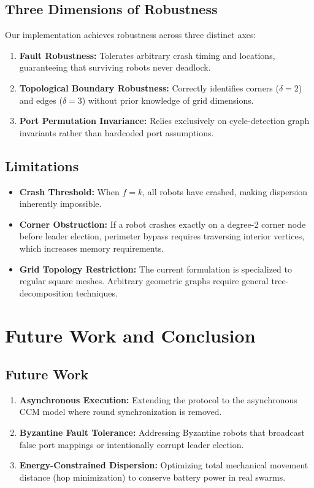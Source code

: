 \documentclass[11pt,a4paper]{report}
\begin{document}
\section{Three Dimensions of Robustness}
Our implementation achieves robustness across three distinct axes:
\begin{enumerate}
    \item \textbf{Fault Robustness:} Tolerates arbitrary crash timing and locations, guaranteeing that surviving robots never deadlock.
    \item \textbf{Topological Boundary Robustness:} Correctly identifies corners ($\delta=2$) and edges ($\delta=3$) without prior knowledge of grid dimensions.
    \item \textbf{Port Permutation Invariance:} Relies exclusively on cycle-detection graph invariants rather than hardcoded port assumptions.
\end{enumerate}

\section{Limitations}
\begin{itemize}
    \item \textbf{Crash Threshold:} When $f = k$, all robots have crashed, making dispersion inherently impossible.
    \item \textbf{Corner Obstruction:} If a robot crashes exactly on a degree-2 corner node before leader election, perimeter bypass requires traversing interior vertices, which increases memory requirements.
    \item \textbf{Grid Topology Restriction:} The current formulation is specialized to regular square meshes. Arbitrary geometric graphs require general tree-decomposition techniques.
\end{itemize}

\chapter{Future Work and Conclusion}

\section{Future Work}
\begin{enumerate}
    \item \textbf{Asynchronous Execution:} Extending the protocol to the asynchronous CCM model where round synchronization is removed.
    \item \textbf{Byzantine Fault Tolerance:} Addressing Byzantine robots that broadcast false port mappings or intentionally corrupt leader election.
    \item \textbf{Energy-Constrained Dispersion:} Optimizing total mechanical movement distance (hop minimization) to conserve battery power in real swarms.
\end{enumerate}
\end{document}
